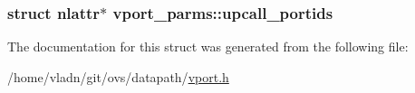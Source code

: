 \subsubsection[{upcall\+\_\+portids}]{\setlength{\rightskip}{0pt plus 5cm}struct nlattr$\ast$ vport\+\_\+parms\+::upcall\+\_\+portids}\label{structvport__parms_ae9dbd12fddc1869a17229cef771a4d29}


The documentation for this struct was generated from the following file\+:\begin{DoxyCompactItemize}
\item 
/home/vladn/git/ovs/datapath/\hyperlink{vport_8h}{vport.\+h}\end{DoxyCompactItemize}
